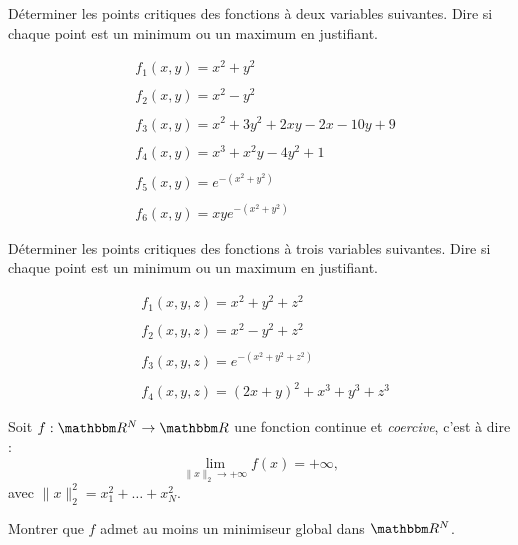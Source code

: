 \begin{exercice}

D\'eterminer les points critiques des fonctions \`a deux variables suivantes. Dire si chaque point est un minimum ou un maximum en justifiant.

\begin{align*}
&f_1(x,y)=x^2+y^2 \\\\
&f_2(x,y)=x^2-y^2 \\\\
&f_3(x,y)=x^2+3y^2+2xy-2x-10y+9 \\\\
&f_4(x,y)=x^3+x^2y-4y^2+1\\\\
&f_5(x,y)=e^{-(x^2+y^2)}\\\\
&f_6(x,y)=xye^{-(x^2+y^2)}
\end{align*}

\end{exercice}

\medskip

\begin{exercice}

D\'eterminer les points critiques des fonctions \`a trois variables suivantes. Dire si chaque point est un minimum ou un maximum en justifiant.

\begin{align*}
&f_1(x,y,z)=x^2+y^2+z^2\\\\
&f_2(x,y,z)=x^2-y^2+z^2\\\\
&f_3(x,y,z)=e^{-(x^2+y^2+z^2)}\\\\
&f_4(x,y,z)=(2x+y)^2 + x^3 + y^3 + z^3
\end{align*}

\end{exercice}

\medskip

\begin{exercice}

Soit $f : \eR^N \rightarrow \eR$ une fonction continue et \emph{coercive}, c'est à dire :
\[
\lim_{\| x \|_2 \rightarrow + \infty} f(x) = + \infty,
\]
avec $\| x \|_2^2 = x_1^2 + \ldots + x_N^2$. 

\medskip

Montrer que $f$ admet au moins un minimiseur global dans $\eR^N$.
\end{exercice}

